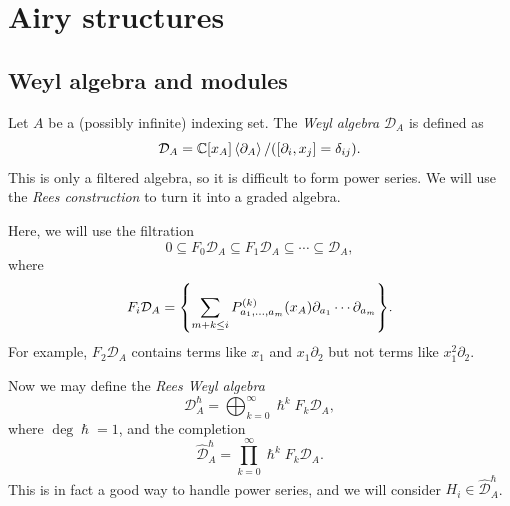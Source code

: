 \documentclass[leqno, openany]{memoir}
\theoremstyle{definition}
\theoremstyle{remark}
\theoremstyle{plain}
\theoremstyle{definition}
\theoremstyle{remark}
\newcommand{\C}{\mathbb{C}}
\newcommand{\mc}[1]{\mathcal{#1}}
\newcommand{\wh}[1]{\widehat{#1}}
\begin{document}
\section{Airy structures}

\subsection{Weyl algebra and modules}

Let $A$ be a (possibly infinite) indexing set. The \textit{Weyl algebra} $\mc{D}_A$ is defined as 
\[ \mc{D}_A = \C[x_A] \ev{\partial_A} / ([\partial_i, x_j] = \delta_{ij}). \]
This is only a filtered algebra, so it is difficult to form power series. We will use the \textit{Rees construction} to turn it into a graded algebra.

Here, we will use the filtration
\[ \qty{0} \subseteq F_0 \mc{D}_A \subseteq F_1 \mc{D}_A \subseteq \cdots \subseteq \mc{D}_A, \]
where
\[ F_i \mc{D}_A = \qty{\sum_{m+k\leq i} P_{a_1, \ldots, a_m}^{(k)}(x_A) \partial_{a_1} \cdots \partial_{a_m}}. \]
For example, $F_2 \mc{D}_A$ contains terms like $x_1$ and $x_1 \partial_2$ but not terms like $x_1^2 \partial_2$.

Now we may define the \textit{Rees Weyl algebra}
\[ \mc{D}_A^{\hslash} = \bigoplus_{k=0}^{\infty} \hslash^k F_k \mc{D}_A, \]
where $\deg \hslash = 1$, and the completion
\[ \wh{\mc{D}}_A^{\hslash} = \prod_{k=0}^{\infty} \hslash^k F_k \mc{D}_A. \]
This is in fact a good way to handle power series, and we will consider $H_i \in \wh{\mc{D}}_A^{\hslash}$.
\end{document}
